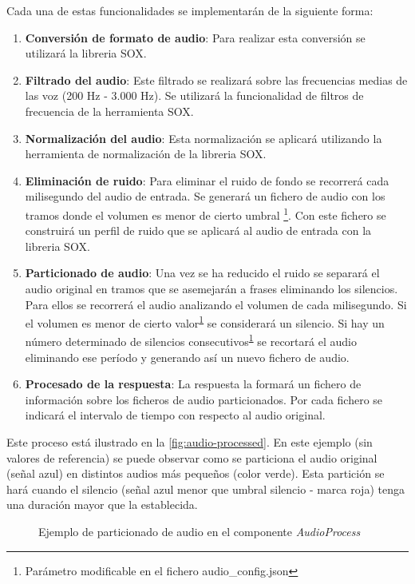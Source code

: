 \documentclass[../main.tex]{subfiles}
\begin{document}
Cada una de estas funcionalidades se implementarán de la siguiente forma:
\begin{enumerate}
    \item \textbf{Conversión de formato de audio}: Para realizar esta conversión se utilizará la libreria SOX.
    \item \textbf{Filtrado del audio}: Este filtrado se realizará sobre las frecuencias medias de las voz (200 Hz - 3.000 Hz). Se utilizará la funcionalidad de filtros de frecuencia de la herramienta SOX.
    \item \textbf{Normalización del audio}: Esta normalización se aplicará utilizando la herramienta de normalización de la libreria SOX.
    \item \textbf{Eliminación de ruido}: Para eliminar el ruido de fondo se recorrerá cada milisegundo del audio de entrada. Se generará un fichero de audio con los tramos donde el volumen es menor de cierto umbral \footnote{Parámetro modificable en el fichero audio\_config.json\label{footnote:audio_modificable}}. Con este fichero se construirá un perfil de ruido que se aplicará al audio de entrada con la libreria SOX.
    \item \textbf{Particionado de audio}: Una vez se ha reducido el ruido se separará el audio original en tramos que se asemejarán a frases eliminando los silencios. Para ellos se recorrerá el audio analizando el volumen de cada milisegundo. Si el volumen es menor de cierto valor\textsuperscript{\ref{footnote:audio_modificable}} se considerará un silencio. Si hay un número determinado de silencios consecutivos\textsuperscript{\ref{footnote:audio_modificable}} se recortará el audio eliminando ese período y generando así un nuevo fichero de audio.
    \item \textbf{Procesado de la respuesta}: La respuesta la formará un fichero de información sobre los ficheros de audio particionados. Por cada fichero se indicará el intervalo de tiempo con respecto al audio original.
\end{enumerate}

Este proceso está ilustrado en la \autoref{fig:audio-processed}. En este ejemplo (sin valores de referencia) se puede observar como se particiona el audio original (señal azul) en distintos audios más pequeños (color verde). Esta partición se hará cuando el silencio (señal azul menor que umbral silencio - marca roja) tenga una duración mayor que la establecida.

\begin{figure}[H]
    \centering
    
    \caption{Ejemplo de particionado de audio en el componente \textit{AudioProcess}}
    \label{fig:audio-processed}
\end{figure}
\end{document}
